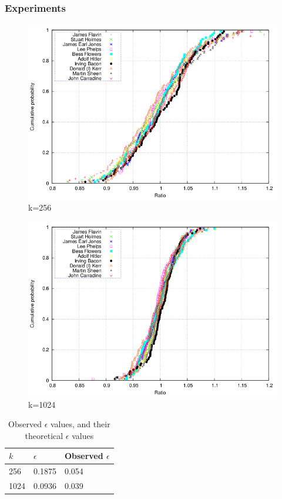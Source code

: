 \documentclass[a4paper,11pt]{article}
\begin{document}
\subsubsection{Experiments}
\begin{figure}[H]
\centering \includegraphics[width=1\textwidth]{plot256.png}
\caption{k=256}
\label{fig:exp256}
\end{figure}
\begin{figure}[H]
\centering \includegraphics[width=1\textwidth]{plot1024.png}
\caption{k=1024}
\label{fig:exp1024}
\end{figure}
\begin{table}[H]
    \begin{center}
    \begin{tabular}{l|l|l}
    $k$    & $\epsilon$      & Observed $\epsilon$ \\ \hline
    256  & 0.1875 & 0.054      \\ \hline
    1024 & 0.0936 & 0.039      \\
    \end{tabular}
    \end{center}
\caption{Observed $\epsilon$ values, and their theoretical $\epsilon$ values}\label{tab:epsilon}
\end{table}
\end{document}
